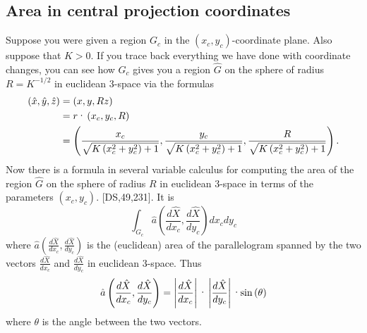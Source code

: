 \documentclass{ximera}
\begin{document}
\subsection*{Area in central projection coordinates}

Suppose you were given a region $G_{c}$ in the $\left(  x_{c},y_{c}\right)
$-coordinate plane. Also suppose that $K>0$. If you trace back everything we
have done with coordinate changes, you can see how $G_{c}$ gives you a region
$\hat{G}$ on the sphere of radius $R=K^{-1/2}$ in euclidean $3$-space via the
formulas%
\begin{align*}
\left(  \hat{x},\hat{y},\hat{z}\right)   &  =\left(  x,y,Rz\right) \\
&  =r\text{\textperiodcentered}\left(  x_{c},y_{c},R\right) \\
&  =\left(  \frac{x_{c}}{\sqrt{K\left(  x_{c}^{2}+y_{c}^{2}\right)  +1}}%
,\frac{y_{c}}{\sqrt{K\left(  x_{c}^{2}+y_{c}^{2}\right)  +1}},\frac{R}%
{\sqrt{K\left(  x_{c}^{2}+y_{c}^{2}\right)  +1}}\right)  .
\end{align*}
Now there is a formula in several variable calculus for computing the area of
the region $\hat{G}$ on the sphere of radius $R$ in euclidean $3$-space in
terms of the parameters $\left(  x_{c},y_{c}\right)  $. [DS,49,231]. It is
\begin{equation}%
{\displaystyle\int\nolimits_{G_{c}}}
\hat{a}\left(  \frac{d\hat{X}}{dx_{c}},\frac{d\hat{X}}{dy_{c}}\right)
dx_{c}dy_{c} \label{68}%
\end{equation}
where $\hat{a}\left(  \frac{d\hat{X}}{dx_{c}},\frac{d\hat{X}}{dy_{c}}\right)
$ is the (euclidean) area of the parallelogram spanned by the two vectors
$\frac{d\hat{X}}{dx_{c}}$ and $\frac{d\hat{X}}{dy_{c}}$ in euclidean
$3$-space. Thus%
\[
\hat{a}\left(  \frac{d\hat{X}}{dx_{c}},\frac{d\hat{X}}{dy_{c}}\right)
=\left\vert \frac{d\hat{X}}{dx_{c}}\right\vert \text{\textperiodcentered
}\left\vert \frac{d\hat{X}}{dy_{c}}\right\vert \text{\textperiodcentered
}\mathrm{sin}\left(  \theta\right)
\]
where $\theta$ is the angle between the two vectors.
\end{document}
